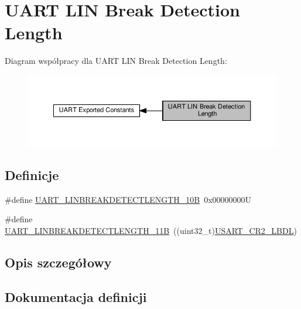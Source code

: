 \hypertarget{group___u_a_r_t___l_i_n___break___detection___length}{}\section{U\+A\+RT L\+IN Break Detection Length}
\label{group___u_a_r_t___l_i_n___break___detection___length}
Diagram współpracy dla U\+A\+RT L\+IN Break Detection Length\+:\nopagebreak
\begin{figure}[H]
\begin{center}
\leavevmode
\includegraphics[width=350pt]{group___u_a_r_t___l_i_n___break___detection___length}
\end{center}
\end{figure}
\subsection*{Definicje}
\begin{DoxyCompactItemize}
\item 
\#define \hyperlink{group___u_a_r_t___l_i_n___break___detection___length_ga027616b7a36b36e0e51ffee947533624}{U\+A\+R\+T\+\_\+\+L\+I\+N\+B\+R\+E\+A\+K\+D\+E\+T\+E\+C\+T\+L\+E\+N\+G\+T\+H\+\_\+10B}~0x00000000U
\item 
\#define \hyperlink{group___u_a_r_t___l_i_n___break___detection___length_ga2f66fcd37de7a3ca9e1101305f2e23e6}{U\+A\+R\+T\+\_\+\+L\+I\+N\+B\+R\+E\+A\+K\+D\+E\+T\+E\+C\+T\+L\+E\+N\+G\+T\+H\+\_\+11B}~((uint32\+\_\+t)\hyperlink{group___peripheral___registers___bits___definition_ga7f9bc41700717fd93548e0e95b6072ed}{U\+S\+A\+R\+T\+\_\+\+C\+R2\+\_\+\+L\+B\+DL})
\end{DoxyCompactItemize}


\subsection{Opis szczegółowy}


\subsection{Dokumentacja definicji}
\mbox{\label{group___u_a_r_t___l_i_n___break___detection___length_ga027616b7a36b36e0e51ffee947533624}} 
